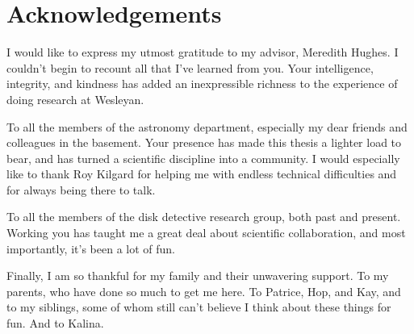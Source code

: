 \chapter{Acknowledgements}

I would like to express my utmost gratitude to my advisor, Meredith Hughes.
I couldn't begin to recount all that I've learned from you.
Your intelligence, integrity, and kindness has added an inexpressible richness to the experience of doing research at Wesleyan.

To all the members of the astronomy department, especially my dear friends and colleagues in the basement.
Your presence has made this thesis a lighter load to bear, and has turned a scientific discipline into a community.
I would especially like to thank Roy Kilgard for helping me with endless technical difficulties and for always being there to talk.

To all the members of the disk detective research group, both past and present.
Working you has taught me a great deal about scientific collaboration, and most importantly, it's been a lot of fun.

Finally, I am so thankful for my family and their unwavering support.
To my parents, who have done so much to get me here.
To Patrice, Hop, and Kay, and to my siblings, some of whom still can't believe I think about these things for fun.
And to Kalina.
